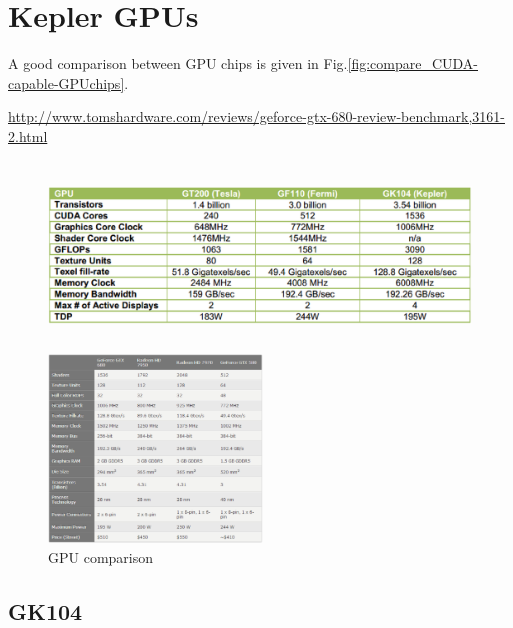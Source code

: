 \section{Kepler GPUs}

A good comparison between GPU chips is given in
Fig.\ref{fig:compare_CUDA-capable-GPUchips}.

\url{http://www.tomshardware.com/reviews/geforce-gtx-680-review-benchmark,3161-2.html}

\begin{figure}[hbt]
  \centerline{\includegraphics[height=5cm,
    angle=0]{./images/CUDA_GPU_comparison.eps}}
  \centerline{\includegraphics[height=5cm,
    angle=0]{./images/Compare_GTX680_GTX580.eps}} 
  \caption{GPU comparison}
\label{fig:CUDA_GPU_comparison}
\end{figure}

\subsection{GK104}
\label{sec:GK104}

